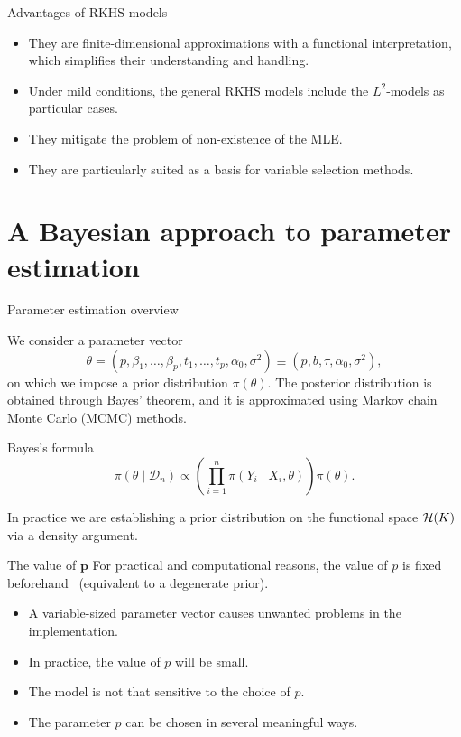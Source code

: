 \documentclass[9pt, english, professionalfonts]{beamer}
\newcommand\maroon[1]{\color{mLightBrown}#1\color{mDarkTeal}}
\newcommand{\Hcal} {\ensuremath\mathcal{H}}
\begin{document}
\begin{frame}{Advantages of RKHS models}
  \begin{itemize}
    \item They are finite-dimensional approximations with a functional interpretation, which simplifies their understanding and handling.
    \item Under mild conditions, the general RKHS models include the \(L^2\)-models as particular cases.
    \item They mitigate the problem of non-existence of the MLE.
    \item They are particularly suited as a basis for variable selection methods.
  \end{itemize}
\end{frame}

\section{A Bayesian approach to parameter estimation}

\begin{frame}{Parameter estimation overview}

  We consider a parameter vector
  \[
  \theta = (p, \beta_1,\dots, \beta_p, t_1,\dots, t_p, \alpha_0, \sigma^2) \equiv (p, b, \tau, \alpha_0, \sigma^2),
  \]
  on which we impose a prior distribution \(\pi(\theta)\). The posterior distribution is obtained through Bayes' theorem, and it is approximated using Markov chain Monte Carlo (MCMC) methods.

  \vspace{1em}

      \begin{block}{Bayes's formula}
      \[
      \pi(\theta \mid \mathcal D_n) \propto \left( \prod_{i=1}^n \pi(Y_i\mid X_i, \theta) \right)\pi(\theta).
      \]
  \end{block}

  \vspace{1em}

  In practice we are establishing a prior distribution on the functional space \(\Hcal(K)\) via a density argument.

\end{frame}

\begin{frame}{The value of \(\bm p\)}
    For practical and computational reasons, \maroon{the value of \(p\) is fixed beforehand} \ (equivalent to a degenerate prior).

    \begin{itemize}
      \item A variable-sized parameter vector causes unwanted problems in the implementation.
      \item In practice, the value of \(p\) will be small.
      \item The model is not that sensitive to the choice of \(p\).
      \item The parameter \(p\) can be chosen in several meaningful ways.
    \end{itemize}
\end{frame}
\end{document}
